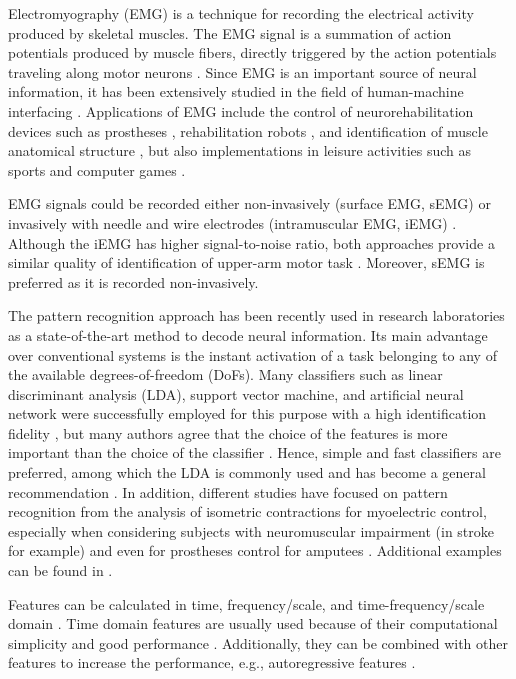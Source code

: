 Electromyography (EMG) is a technique for recording the electrical activity produced by skeletal muscles. The EMG signal is a summation of action potentials produced by muscle fibers, directly triggered by the action potentials traveling along motor neurons \citep{Farina2010}. Since EMG is an important source of neural information, it has been extensively studied in the field of human-machine interfacing  \citep{Nazmi2016, Hakonen2015}. Applications of EMG include the control of neurorehabilitation devices such as prostheses \citep{Parker2206, Li2010}, rehabilitation robots \citep{Marchal-Crespo2009, Broccard2014}, and identification of muscle anatomical structure \citep{Marateb2016}, but also implementations in leisure activities such as sports \citep{Verikas2016} and computer games \citep{vanDijk2016}.

EMG signals could be recorded either non-invasively (surface EMG, sEMG) or invasively with needle and wire electrodes (intramuscular EMG, iEMG) \citep{Marateb1999}. Although the iEMG has higher signal-to-noise ratio, both approaches provide a similar quality of identification of upper-arm motor task \citep{Hargrove2007}. Moreover, sEMG is preferred as it is recorded non-invasively.

The pattern recognition approach has been recently used in research laboratories as a state-of-the-art method to decode neural information. Its main advantage over conventional systems is the instant activation of a task belonging to any of the available degrees-of-freedom (DoFs). Many classifiers such as linear discriminant analysis (LDA), support vector machine, and artificial neural network were successfully employed for this purpose with a high identification fidelity \citep{Oskoei2007}, but many authors agree that the choice of the features is more important than the choice of the classifier \citep{Hargrove2007}. Hence, simple and fast classifiers are preferred, among which the LDA is commonly used and has become a general recommendation \citep{Hakonen2015, Huang2009}. In addition, different studies have focused on pattern recognition from the analysis of isometric contractions for myoelectric control, especially when considering subjects with neuromuscular impairment (in stroke for example) \citep{Celadon2016} and even for prostheses control for amputees \citep{Ameri2012}. Additional examples can be found in \citep{Li2013, Jordanic2016a, Jordanic2016b}.

Features can be calculated in time, frequency/scale, and time-frequency/scale domain \citep{Nazmi2016, Hakonen2015, Oskoei2007}. Time domain features are usually used because of their computational simplicity and good performance \citep{Hakonen2015}. Additionally, they can be combined with other features to increase the performance, e.g., autoregressive features \citep{Hargrove2007}.

